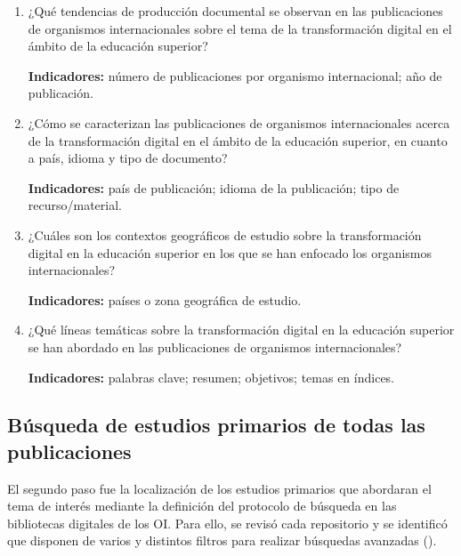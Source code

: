         \begin{enumerate}[label=\textbf{PI\arabic*}]

        \item ¿Qué tendencias de producción documental se observan en las
        publicaciones de organismos internacionales sobre el tema de la
        transformación digital en el ámbito de la educación superior?

        \textbf{Indicadores:} número de publicaciones por organismo
        internacional; año de publicación.

        \item ¿Cómo se caracterizan las publicaciones de organismos
        internacionales acerca de la transformación digital en el ámbito de la
        educación superior, en cuanto a país, idioma y tipo de documento?

        \textbf{Indicadores:} país de publicación; idioma de la publicación;
        tipo de recurso/material.

        \item ¿Cuáles son los contextos geográficos de estudio sobre la
        transformación digital en la educación superior en los que se han
        enfocado los organismos internacionales?

        \textbf{Indicadores:} países o zona geográfica de estudio.

        \item ¿Qué líneas temáticas sobre la transformación digital en la
        educación superior se han abordado en las publicaciones de organismos
        internacionales?

        \textbf{Indicadores:} palabras clave; resumen; objetivos; temas en
        índices.

        \end{enumerate}
    
    
 
      \subsection{Búsqueda de estudios primarios de todas las publicaciones}\label{sub-sec-busqueda-de-estudios-primarios}
    
    El segundo paso fue la localización de los estudios primarios que
    abordaran el tema de interés mediante la definición del protocolo de
    búsqueda en las bibliotecas digitales de los OI. Para ello, se revisó
    cada repositorio y se identificó que disponen de varios y distintos filtros para realizar búsquedas avanzadas ().

